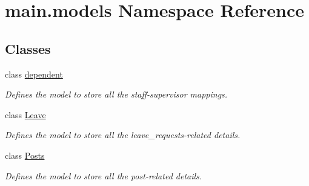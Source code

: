 \hypertarget{namespacemain_1_1models}{}\section{main.\+models Namespace Reference}
\label{namespacemain_1_1models}
\subsection*{Classes}
\begin{DoxyCompactItemize}
\item 
class \hyperlink{classmain_1_1models_1_1dependent}{dependent}
\begin{DoxyCompactList}\small\item\em Defines the model to store all the staff-\/supervisor mappings. \end{DoxyCompactList}\item 
class \hyperlink{classmain_1_1models_1_1Leave}{Leave}
\begin{DoxyCompactList}\small\item\em Defines the model to store all the leave\+\_\+requests-\/related details. \end{DoxyCompactList}\item 
class \hyperlink{classmain_1_1models_1_1Posts}{Posts}
\begin{DoxyCompactList}\small\item\em Defines the model to store all the post-\/related details. \end{DoxyCompactList}\end{DoxyCompactItemize}
